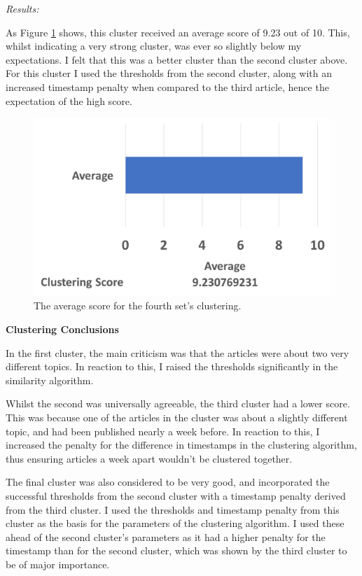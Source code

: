 \documentclass[12pt]{article}
\begin{document}
\emph{Results:}

As Figure \ref{cluster4} shows, this cluster received an average score of 9.23 out of 10. This, whilst indicating a very strong cluster, was ever so slightly below my expectations. I felt that this was a better cluster than the second cluster above. For this cluster I used the thresholds from the second cluster, along with an increased timestamp penalty when compared to the third article, hence the expectation of the high score. \\

\begin{figure}[ht!]
  \centering
    \includegraphics[scale=0.6]{cluster4score.png}
   \caption[The average score for a cluster]{The average score for the fourth set's clustering.}
   \label{cluster4}
\end{figure} 

\textbf{Clustering Conclusions}

In the first cluster, the main criticism was that the articles were about two very different topics. In reaction to this, I raised the thresholds significantly in the similarity algorithm. 

Whilst the second was universally agreeable, the third cluster had a lower score. This was because one of the articles in the cluster was about a slightly different topic, and had been published nearly a week before. In reaction to this, I increased the penalty for the difference in timestamps in the clustering algorithm, thus ensuring articles a week apart wouldn't be clustered together.

The final cluster was also considered to be very good, and incorporated the successful thresholds from the second cluster with a timestamp penalty derived from the third cluster. I used the thresholds and timestamp penalty from this cluster as the basis for the parameters of the clustering algorithm. I used these ahead of the second cluster's parameters as it had a higher penalty for the timestamp than for the second cluster, which was shown by the third cluster to be of major importance.
\end{document}
